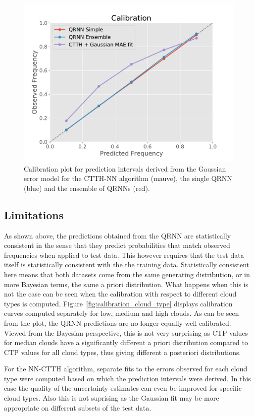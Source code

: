 \documentclass[journal abbreviation, manuscript]{copernicus}
\begin{document}
  \begin{figure}[hbpt!]
    \centering
    \includegraphics[width = 0.5\linewidth]{../plots/calibration_1}
    \caption{Calibration plot for prediction intervals derived from the Gaussian
      error model for the CTTH-NN algorithm (mauve), the single QRNN (blue) and
      the ensemble of QRNNs (red).}
    \label{fig:calibration}
  \end{figure}

\subsection{Limitations}

As shown above, the predictions obtained from the QRNN are statistically
consistent in the sense that they predict probabilities that match observed
frequencies when applied to test data. This however requires that the test data
itself is statistically consistent with the the training data. Statistically
consistent here means that both datasets come from the same generating
distribution, or in more Bayesian terms, the same a priori distribution. What
happens when this is not the case can be seen when the calibration with respect
to different cloud types is computed. Figure~\ref{fig:calibration_cloud_type}
displays calibration curves computed separately for low, medium and high clouds.
As can be seen from the plot, the QRNN predictions are no longer equally well
calibrated. Viewed from the Bayesian perspective, this is not very surprising
as CTP values for median clouds have a significantly different a priori
 distribution compared to CTP values for all cloud types, thus giving
different a posteriori distributions.

 For the NN-CTTH algorithm, separate fits to the errors observed for each cloud
type were computed based on which the prediction intervals were derived. In this
case the quality of the uncertainty estimates can even be improved for specific
cloud types. Also this is not suprising as the Gaussian fit may be more
appropriate on different subsets of the test data. 
\end{document}
